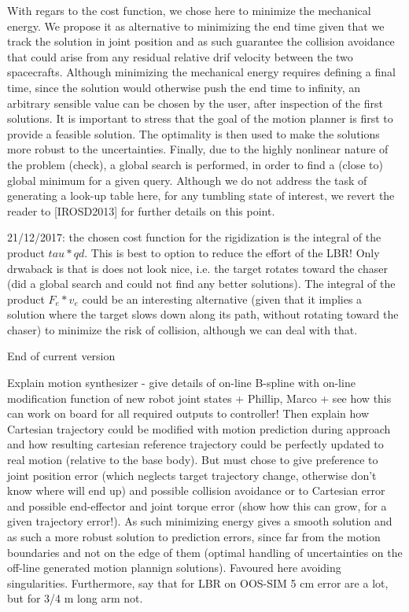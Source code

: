 
With regars to the cost function, we chose here to minimize the mechanical energy. We propose it as alternative to minimizing the end time given that we track the solution in joint position and as such guarantee the collision avoidance that could arise from any residual relative drif velocity between the two spacecrafts. Although minimizing the mechanical energy requires defining a final time, since the solution would otherwise push the end time to infinity, an arbitrary sensible value can be chosen by the user, after inspection of the first solutions. It is important to stress that the goal of the motion planner is first to provide a feasible solution. The optimality is then used to make the solutions more robust to the uncertainties. Finally, due to the highly nonlinear nature of the problem (check), a global search is performed, in order to find a (close to) global minimum for a given query. Although we do not address the task of generating a look-up table here, for any tumbling state of interest, we revert the reader to [IROSD2013] for further details on this point.

21/12/2017: the chosen cost function for the rigidization is the integral of the product $tau*qd$. This is best to option to reduce the effort of the LBR! Only drwaback is that is does not look nice, i.e. the target rotates toward the chaser (did a global search and could not find any better solutions). The integral of the product $F_e*v_e$ could be an interesting alternative (given that it implies a solution where the target slows down along its path, without rotating toward the chaser) to minimize the risk of collision, although we can deal with that.


End of current version


Explain motion synthesizer - give details of on-line B-spline with on-line modification function of new robot joint states + Phillip, Marco + see how this can work on board for all required outputs to controller! Then explain how Cartesian trajectory could be modified with motion prediction during approach and how resulting cartesian reference trajectory could be perfectly updated to real motion (relative to the base body). But must chose to give preference to joint position error (which neglects target trajectory change, otherwise don't know where will end up) and possible collision avoidance or to Cartesian error and possible end-effector and joint torque error (show how this can grow, for a given trajectory error!). As such minimizing energy gives a smooth solution and as such a more robust solution to prediction errors, since far from the motion boundaries and not on the edge of them (optimal handling of uncertainties on the off-line generated motion plannign solutions). Favoured here avoiding singularities. Furthermore, say that for LBR on OOS-SIM 5 cm error are a lot, but for 3/4 m long arm not. 

